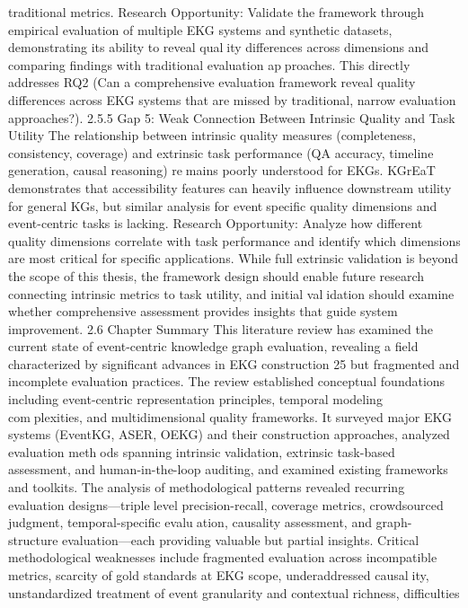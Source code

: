 traditional metrics.
Research Opportunity: Validate the framework through empirical evaluation of
multiple EKG systems and synthetic datasets, demonstrating its ability to reveal quality differences across dimensions and comparing findings with traditional evaluation approaches. This directly addresses RQ2 (Can a comprehensive evaluation framework reveal
quality differences across EKG systems that are missed by traditional, narrow evaluation
approaches?).
2.5.5 Gap 5: Weak Connection Between Intrinsic Quality and
Task Utility
The relationship between intrinsic quality measures (completeness, consistency, coverage)
and extrinsic task performance (QA accuracy, timeline generation, causal reasoning) remains poorly understood for EKGs. KGrEaT demonstrates that accessibility features
can heavily influence downstream utility for general KGs, but similar analysis for eventspecific quality dimensions and event-centric tasks is lacking.
Research Opportunity: Analyze how different quality dimensions correlate with
task performance and identify which dimensions are most critical for specific applications.
While full extrinsic validation is beyond the scope of this thesis, the framework design
should enable future research connecting intrinsic metrics to task utility, and initial validation should examine whether comprehensive assessment provides insights that guide
system improvement.
2.6 Chapter Summary
This literature review has examined the current state of event-centric knowledge graph
evaluation, revealing a field characterized by significant advances in EKG construction
25
but fragmented and incomplete evaluation practices. The review established conceptual
foundations including event-centric representation principles, temporal modeling complexities, and multidimensional quality frameworks. It surveyed major EKG systems
(EventKG, ASER, OEKG) and their construction approaches, analyzed evaluation methods spanning intrinsic validation, extrinsic task-based assessment, and human-in-the-loop
auditing, and examined existing frameworks and toolkits.
The analysis of methodological patterns revealed recurring evaluation designs—triplelevel precision-recall, coverage metrics, crowdsourced judgment, temporal-specific evaluation, causality assessment, and graph-structure evaluation—each providing valuable but
partial insights. Critical methodological weaknesses include fragmented evaluation across
incompatible metrics, scarcity of gold standards at EKG scope, underaddressed causality, unstandardized treatment of event granularity and contextual richness, difficulties
